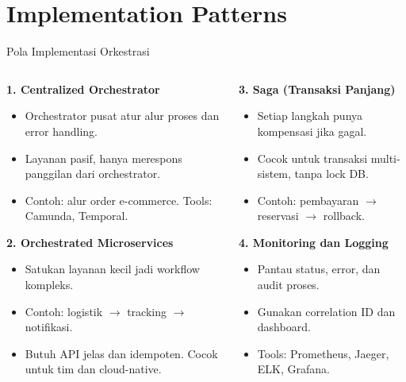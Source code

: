 \documentclass[aspectratio=169, table]{beamer}
\begin{document}
\section{Implementation Patterns}
\begin{frame}[fragile]{Pola Implementasi Orkestrasi}
	\vspace{20pt}
	\begin{columns}[T]
		\begin{column}{0.5\textwidth}
			\textbf{1. Centralized Orchestrator}
			\begin{itemize}
				\item Orchestrator pusat atur alur proses dan error handling.
				\item Layanan pasif, hanya merespons panggilan dari orchestrator.
				\item Contoh: alur order e-commerce. Tools: Camunda, Temporal.
			\end{itemize}
			
			\vspace{4pt}
			\textbf{2. Orchestrated Microservices}
			\begin{itemize}
				\item Satukan layanan kecil jadi workflow kompleks.
				\item Contoh: logistik $\rightarrow$ tracking $\rightarrow$ notifikasi.
				\item Butuh API jelas dan idempoten. Cocok untuk tim dan cloud-native.
			\end{itemize}
		\end{column}
		
		\begin{column}{0.5\textwidth}
			\textbf{3. Saga (Transaksi Panjang)}
			\begin{itemize}
				\item Setiap langkah punya kompensasi jika gagal.
				\item Cocok untuk transaksi multi-sistem, tanpa lock DB.
				\item Contoh: pembayaran $\rightarrow$ reservasi $\rightarrow$ rollback.
			\end{itemize}
			
			\vspace{4pt}
			\textbf{4. Monitoring dan Logging}
			\begin{itemize}
				\item Pantau status, error, dan audit proses.
				\item Gunakan correlation ID dan dashboard.
				\item Tools: Prometheus, Jaeger, ELK, Grafana.
			\end{itemize}
		\end{column}
	\end{columns}
\end{frame}
\end{document}
